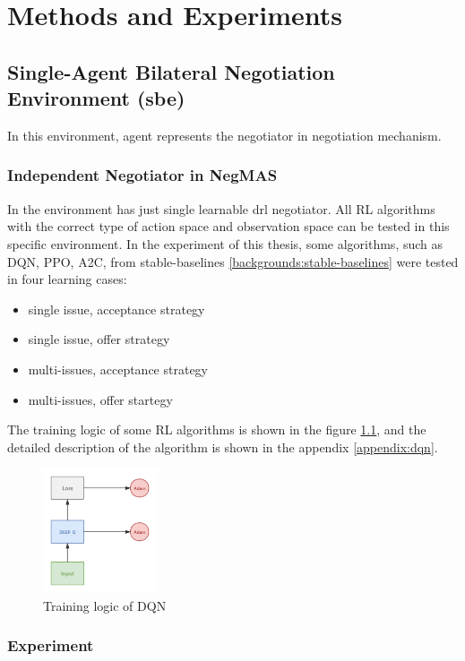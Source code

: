 \chapter{Methods and Experiments} \label{methods-and-experiments}

\section{Single-Agent Bilateral Negotiation Environment (\gls{sbe})}
In this environment, agent represents the negotiator in negotiation mechanism.

\subsection{Independent Negotiator in NegMAS}
In the environment has just single learnable \gls{drl} negotiator. All RL algorithms with the correct type of action space and observation space can be tested in this specific environment. In the experiment of this thesis, some algorithms, such as DQN, PPO, A2C, from stable-baselines \ref{backgrounds:stable-baselines} were tested in four learning cases:
\begin{itemize}
	\item single issue, acceptance strategy
	\item single issue, offer strategy
	\item multi-issues, acceptance strategy
	\item multi-issues, offer startegy
\end{itemize}

The training logic of some RL algorithms is shown in the figure \ref{fig:dqn}, and the detailed description of the algorithm is shown in the appendix \ref{appendix:dqn}.

\begin{figure}[htbp]
\centering
\includegraphics[width=0.30\textwidth]{./images/dqn.png}
\caption{Training logic of DQN}
\label{fig:dqn}
\end{figure}

\subsection{Experiment} \label{sbe:experiment}

